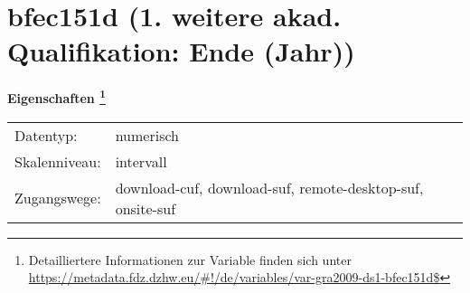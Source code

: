 
    \setcounter{footnote}{0}

    \vspace*{-1.8cm}
	\section{bfec151d (1. weitere akad. Qualifikation: Ende (Jahr))}
	\label{section:bfec151d}



    \vspace*{0.5cm}
    \noindent\textbf{Eigenschaften
	\footnote{Detailliertere Informationen zur Variable finden sich unter
		\url{https://metadata.fdz.dzhw.eu/\#!/de/variables/var-gra2009-ds1-bfec151d$}}}\\
	\begin{tabularx}{\hsize}{@{}lX}
	Datentyp: & numerisch \\
	Skalenniveau: & intervall \\
	Zugangswege: &
	  download-cuf, 
	  download-suf, 
	  remote-desktop-suf, 
	  onsite-suf
 \\
    \end{tabularx}



